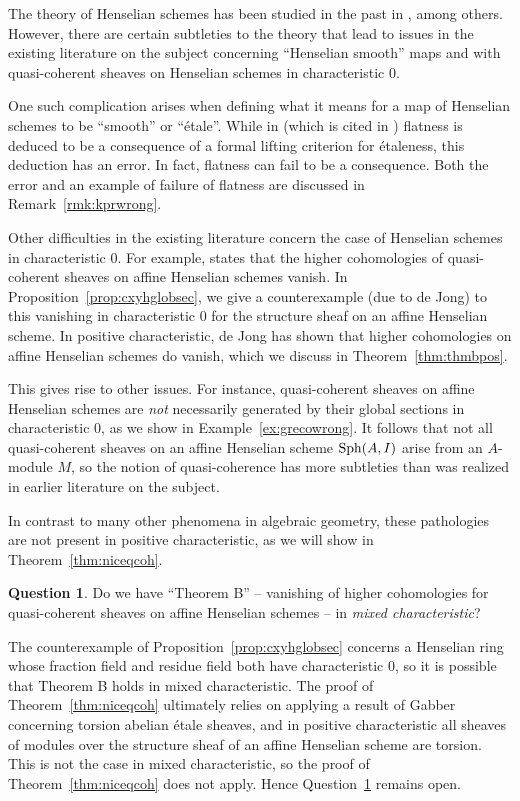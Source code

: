 \documentclass[12pt]{article}
\newcommand{\sph}{{\rm Sph}}
\newcommand{\Et}{\'etale\xspace}
\newcommand{\spcite}[2]{\cite[\href{https://stacks.math.columbia.edu/tag/#1}{{#2} {#1}}]{stackp}}
\theoremstyle{definition}
\newtheorem{question}[theorem]{Question}
\numberwithin{equation}{subsection}
\begin{document}
The theory of Henselian schemes has been studied in the past in \cite{cox1, greco71, greco81, kato17, kpr}, among others. However, there are certain subtleties to the theory that lead to issues in the existing literature on the subject concerning ``Henselian smooth'' maps and with quasi-coherent sheaves on Henselian schemes in characteristic $0$.

One such complication arises when defining what it means for a map of Henselian schemes to be ``smooth'' or ``\Et''. While in \cite{kpr} (which is cited in \cite{cox1}) flatness is deduced to be a consequence of a formal lifting criterion for {\Et}ness, this deduction has an error. In fact, flatness can fail to be a consequence. Both the error and an example of failure of flatness are discussed in Remark~\ref{rmk:kprwrong}. 

Other difficulties in the existing literature concern the case of Henselian schemes in characteristic $0$. For example, \cite[Theorem 1.12 (Theorem B)]{greco81} states that the higher cohomologies of quasi-coherent sheaves on affine Henselian schemes vanish. In Proposition~\ref{prop:cxyhglobsec}, we give a counterexample (due to de Jong) to this vanishing in characteristic $0$ for the structure sheaf on an affine Henselian scheme. In positive characteristic, de Jong has shown that higher cohomologies on affine Henselian schemes do vanish, which we discuss in Theorem~\ref{thm:thmbpos}.

This gives rise to other issues. For instance, quasi-coherent sheaves on affine Henselian schemes are {\it not} necessarily generated by their global sections in characteristic 0, as we show in Example~\ref{ex:grecowrong}. It follows that not all quasi-coherent sheaves on an affine Henselian scheme $\sph(A,I)$ arise from an $A$-module $M$, so the notion of quasi-coherence has more subtleties than was realized in earlier literature on the subject.

In contrast to many other phenomena in algebraic geometry, these pathologies are not present in positive characteristic, as we will show in Theorem~\ref{thm:niceqcoh}.

\begin{question}\label{qxn:mixthmb} Do we have ``Theorem B'' -- vanishing of higher cohomologies for quasi-coherent sheaves on affine Henselian schemes -- in {\it mixed characteristic}? \end{question}

The counterexample of Proposition~\ref{prop:cxyhglobsec} concerns a Henselian ring whose fraction field and residue field both have characteristic $0$, so it is possible that Theorem B holds in mixed characteristic. The proof of Theorem~\ref{thm:niceqcoh} ultimately relies on applying a result of Gabber \spcite{09ZI}{Theorem} concerning torsion abelian \Et sheaves, and in positive characteristic all sheaves of modules over the structure sheaf of an affine Henselian scheme are torsion. This is not the case in mixed characteristic, so the proof of Theorem~\ref{thm:niceqcoh} does not apply. Hence Question~\ref{qxn:mixthmb} remains open.
\end{document}
